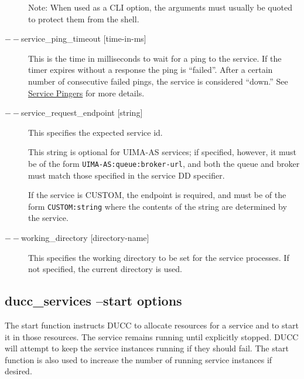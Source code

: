 \begin{description}
        Note: When used as a CLI option, the arguments must usually be
        quoted to protect them from the shell.

      \item[$--$service\_ping\_timeout {[time-in-ms]}] This is the time in milliseconds to wait for a
        ping to the service.  If the timer expires without a response the ping is ``failed''. After
        a certain number of consecutive failed pings, the service is considered ``down.''  See
        \hyperref[sec:service.pingers]{Service Pingers} for more details.

      \item[$--$service\_request\_endpoint {[string]}] This specifies the expected service id.  
        \begin{sloppypar}
          This string is optional for UIMA-AS services; if specified, however, it must be of the
          form {\tt UIMA-AS:queue:broker-url}, and both the queue and broker must match those specified in the
          service DD specifier.
        \end{sloppypar}

        If the service is CUSTOM, the endpoint is required, and must be of the form
        {\tt CUSTOM:string} where the contents of the string are determined by the service.
        
        \item[$--$working\_directory {[directory-name]}]
          This specifies the working directory to be set for the service processes. 
          If not specified, the current directory is used.
    \end{description}


    \subsection{ducc\_services --start options}

    The start function instructs DUCC to allocate resources for a service and to start it in those
    resources. The service remains running until explicitly stopped. DUCC will attempt to keep the
    service instances running if they should fail. The start function is also used to increase the
    number of running service instances if desired.
    

